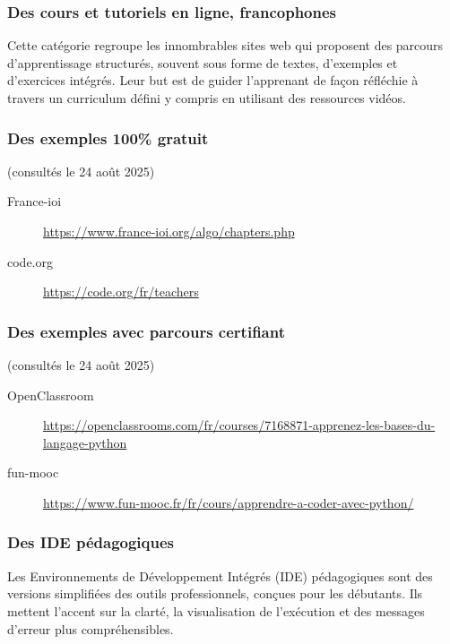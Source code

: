 \documentclass[11pt,a4paper]{article}
\begin{document}
\subsubsection{Des cours et tutoriels en ligne, francophones}
Cette catégorie regroupe les innombrables sites web qui proposent des parcours d'apprentissage structurés, souvent sous forme de textes, d'exemples et d'exercices intégrés. Leur but est de guider l'apprenant de façon réfléchie à travers un curriculum défini y compris en utilisant des ressources vidéos. 

\subsubsection*{Des exemples 100\% gratuit}
(consultés le 24 août 2025) \begin{description}
    \item[France-ioi] \url{https://www.france-ioi.org/algo/chapters.php}
    \item[code.org] \url{https://code.org/fr/teachers}
\end{description}
\subsubsection*{Des exemples avec parcours certifiant}
(consultés le 24 août 2025) \begin{description}
    \item[OpenClassroom]
    \url{https://openclassrooms.com/fr/courses/7168871-apprenez-les-bases-du-langage-python}
    \item[fun-mooc] \url{https://www.fun-mooc.fr/fr/cours/apprendre-a-coder-avec-python/}
\end{description}


\subsubsection{Des IDE pédagogiques}
Les Environnements de Développement Intégrés (IDE) pédagogiques sont des versions simplifiées des outils professionnels, conçues pour les débutants. Ils mettent l'accent sur la clarté, la visualisation de l'exécution et des messages d'erreur plus compréhensibles.
\end{document}
